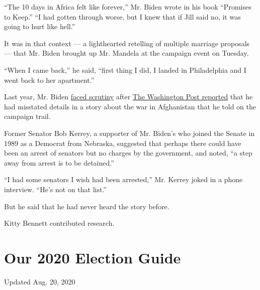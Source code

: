 ``The 10 days in Africa felt like forever,'' Mr. Biden wrote in his book
``Promises to Keep.'' ``I had gotten through worse, but I knew that if
Jill said no, it was going to hurt like hell.''

It was in that context --- a lighthearted retelling of multiple marriage
proposals --- that Mr. Biden brought up Mr. Mandela at the campaign
event on Tuesday.

``When I came back,'' he said, ``first thing I did, I landed in
Philadelphia and I went back to her apartment.''

Last year, Mr. Biden
\href{https://www.nytimes3xbfgragh.onion/2019/08/29/us/politics/joe-biden-gaffes-military-history.html}{faced
scrutiny} after
\href{https://www.washingtonpost.com/politics/as-he-campaigns-for-president-joe-biden-tells-a-moving-but-false-war-story/2019/08/29/b5159676-c9aa-11e9-a1fe-ca46e8d573c0_story.html}{The
Washington Post reported} that he had misstated details in a story about
the war in Afghanistan that he told on the campaign trail.

Former Senator Bob Kerrey, a supporter of Mr. Biden's who joined the
Senate in 1989 as a Democrat from Nebraska, suggested that perhaps there
could have been an arrest of senators but no charges by the government,
and noted, ``a step away from arrest is to be detained.''

``I had some senators I wish had been arrested,'' Mr. Kerrey joked in a
phone interview. ``He's not on that list.''

But he said that he had never heard the story before.

Kitty Bennett contributed research.

\hypertarget{our-2020-election-guide}{%
\section{Our 2020 Election Guide}\label{our-2020-election-guide}}

Updated Aug. 20, 2020

